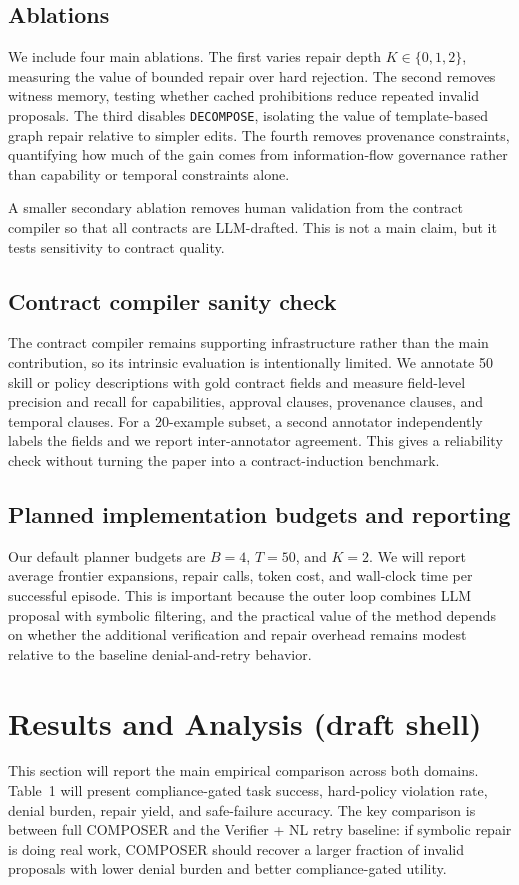 \documentclass[11pt]{article}
\begin{document}
\subsection{Ablations}
We include four main ablations. The first varies repair depth $K \in \{0,1,2\}$, measuring the value of bounded repair over hard rejection. The second removes witness memory, testing whether cached prohibitions reduce repeated invalid proposals. The third disables \texttt{DECOMPOSE}, isolating the value of template-based graph repair relative to simpler edits. The fourth removes provenance constraints, quantifying how much of the gain comes from information-flow governance rather than capability or temporal constraints alone.

A smaller secondary ablation removes human validation from the contract compiler so that all contracts are LLM-drafted. This is not a main claim, but it tests sensitivity to contract quality.

\subsection{Contract compiler sanity check}
The contract compiler remains supporting infrastructure rather than the main contribution, so its intrinsic evaluation is intentionally limited. We annotate 50 skill or policy descriptions with gold contract fields and measure field-level precision and recall for capabilities, approval clauses, provenance clauses, and temporal clauses. For a 20-example subset, a second annotator independently labels the fields and we report inter-annotator agreement. This gives a reliability check without turning the paper into a contract-induction benchmark.

\subsection{Planned implementation budgets and reporting}
Our default planner budgets are $B=4$, $T=50$, and $K=2$. We will report average frontier expansions, repair calls, token cost, and wall-clock time per successful episode. This is important because the outer loop combines LLM proposal with symbolic filtering, and the practical value of the method depends on whether the additional verification and repair overhead remains modest relative to the baseline denial-and-retry behavior.

\section{Results and Analysis (draft shell)}
This section will report the main empirical comparison across both domains. Table~1 will present compliance-gated task success, hard-policy violation rate, denial burden, repair yield, and safe-failure accuracy. The key comparison is between full COMPOSER and the Verifier + NL retry baseline: if symbolic repair is doing real work, COMPOSER should recover a larger fraction of invalid proposals with lower denial burden and better compliance-gated utility.
\end{document}
